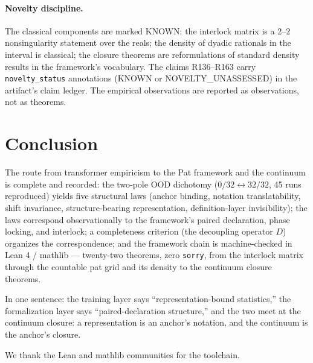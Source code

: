 \documentclass[sigplan,10pt,anonymous,review]{acmart}
\begin{document}
\paragraph{Novelty discipline.}
The classical components are marked KNOWN: the interlock matrix is a
2--2 nonsingularity statement over the reals; the density of dyadic
rationals in the interval is classical; the closure theorems are
reformulations of standard density results in the framework's
vocabulary. The claims R136--R163 carry \texttt{novelty\_status}
annotations (KNOWN or NOVELTY\_UNASSESSED) in the artifact's claim
ledger. The empirical observations are reported as observations, not
as theorems.

\section{Conclusion}

The route from transformer empiricism to the Pat framework and the
continuum is complete and recorded: the two-pole OOD dichotomy
($0/32 \leftrightarrow 32/32$, 45 runs reproduced) yields five
structural laws (anchor binding, notation translatability, shift
invariance, structure-bearing representation, definition-layer
invisibility); the laws correspond observationally to the framework's
paired declaration, phase locking, and interlock; a completeness
criterion (the decoupling operator $D$) organizes the correspondence;
and the framework chain is machine-checked in Lean 4 / mathlib ---
twenty-two theorems, zero \texttt{sorry}, from the interlock matrix
through the countable pat grid and its density to the continuum
closure theorems.

In one sentence: the training layer says ``representation-bound
statistics,'' the formalization layer says ``paired-declaration
structure,'' and the two meet at the continuum closure: a
representation is an anchor's notation, and the continuum is the
anchor's closure.

\begin{acks}
We thank the Lean and mathlib communities for the toolchain.
\end{acks}



\end{document}
